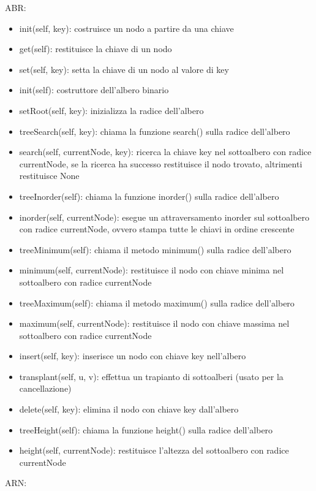 \documentclass{article}
\begin{document}
ABR:
\begin{itemize}
\item init(self, key): costruisce un nodo a partire da una chiave
\item get(self): restituisce la chiave di un nodo
\item set(self, key): setta la chiave di un nodo al valore di key
\item init(self): costruttore dell'albero binario
\item setRoot(self, key): inizializza la radice dell'albero
\item treeSearch(self, key): chiama la funzione search() sulla radice dell'albero
\item search(self, currentNode, key): ricerca la chiave key nel sottoalbero con radice currentNode, se la ricerca ha successo restituisce il nodo trovato, altrimenti restituisce None
\item treeInorder(self): chiama la funzione inorder() sulla radice dell'albero
\item inorder(self, currentNode): esegue un attraversamento inorder sul sottoalbero con radice currentNode, ovvero stampa tutte le chiavi in ordine crescente
\item treeMinimum(self): chiama il metodo minimum() sulla radice dell'albero
\item minimum(self, currentNode): restituisce il nodo con chiave minima nel sottoalbero con radice currentNode
\item treeMaximum(self): chiama il metodo maximum() sulla radice dell'albero
\item maximum(self, currentNode): restituisce il nodo con chiave massima nel sottoalbero con radice currentNode
\item insert(self, key): inserisce un nodo con chiave key nell'albero
\item transplant(self, u, v): effettua un trapianto di sottoalberi (usato per la cancellazione)
\item delete(self, key): elimina il nodo con chiave key dall'albero
\item treeHeight(self): chiama la funzione height() sulla radice dell'albero
\item height(self, currentNode): restituisce l'altezza del sottoalbero con radice currentNode
\end{itemize}
ARN:
\end{document}
